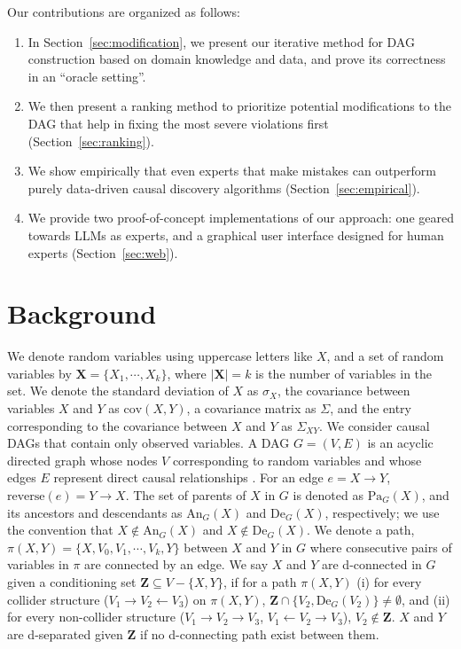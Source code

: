 \documentclass[accepted]{uai2025} %
\begin{document}
Our contributions are organized as follows:

\begin{enumerate}
    \item In Section~\ref{sec:modification}, we present our iterative method for DAG construction
	based on domain knowledge and data, and prove its correctness in an ``oracle setting''.
    \item We then present a ranking method to prioritize potential modifications to the DAG that 
    	    help in fixing the most severe violations first (Section~\ref{sec:ranking}).
    \item We show empirically that even experts that make mistakes can outperform purely 
	data-driven
	causal discovery algorithms (Section~\ref{sec:empirical}).
    \item We provide two proof-of-concept implementations of our approach: one geared towards
	LLMs as experts, and a graphical user interface designed 
	for human experts (Section~\ref{sec:web}).
\end{enumerate}

\section{Background}
\label{sec:background}
We denote random variables using uppercase letters like $X$, and a set of
random variables by $ \bm{X} = \{X_1, \cdots, X_k\} $, where $ \rvert \bm{X}
\rvert = k $ is the number of variables in the set. We denote the standard
deviation of $ X $ as $ \sigma_X $, the covariance between variables $ X $ and
$ Y $ as $ \mathrm{cov}(X, Y) $, a covariance matrix as $ \Sigma $, and the
entry corresponding to the covariance between $ X $ and $ Y $ as $ \Sigma_{XY}
$. We consider causal DAGs that contain only observed variables. A DAG $ G =
(V, E) $ is an acyclic directed graph whose nodes $ V $ corresponding to random
variables and whose edges $ E $ represent direct causal relationships
\cite{Pearl2009}. For an edge $e=X \to Y$, $\textrm{reverse}(e)=Y \to X$. The
set of parents of $ X $ in $ G $ is denoted as $ \textrm{Pa}_G(X) $, and its
ancestors and descendants as $ \textrm{An}_G(X) $ and $ \textrm{De}_G(X) $,
respectively; we use the convention that $X \notin \textrm{An}_G(X)$ and $X
\notin \textrm{De}_G(X)$. We denote a path, $ \pi(X, Y) = \{ X, V_0, V_1,
\cdots, V_k, Y \} $ between $ X $ and $ Y $ in $ G $ where consecutive pairs of
variables in $ \pi $ are connected by an edge. We say $ X $ and $ Y $ are
d-connected in $ G $ given a conditioning set $ \bm{Z} \subseteq V - \{X, Y\}
$, if for a path $ \pi(X, Y) $ (i) for every collider structure ($ V_1
\rightarrow V_2 \leftarrow V_3 $) on $ \pi(X, Y) $, $ \bm{Z} \cap \{ V_2,
\textrm{De}_G(V_2) \} \ne \emptyset $, and (ii) for every non-collider
structure ($ V_1 \rightarrow V_2 \rightarrow V_3 $, $ V_1 \leftarrow V_2
\rightarrow V_3 $), $ V_2 \not \in \bm{Z} $. $ X $ and $ Y $ are d-separated
given $ \bm{Z} $ if no d-connecting path exist between them.
\end{document}
